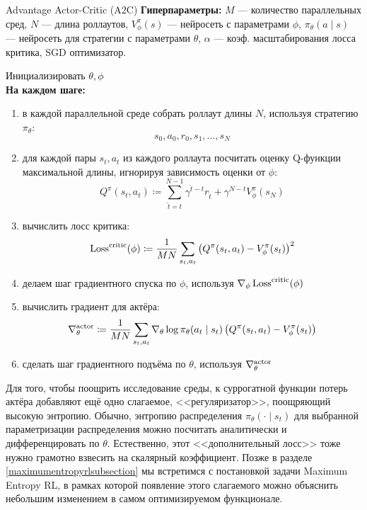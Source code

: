 \begin{algorithm}{Advantage Actor-Critic (A2C)}
\textbf{Гиперпараметры:} $M$ --- количество параллельных сред, $N$ --- длина роллаутов, $V^\pi_\phi(s)$ --- нейросеть с параметрами $\phi$, $\pi_\theta(a \mid s)$ --- нейросеть для стратегии с параметрами $\theta$, $\alpha$ --- коэф. масштабирования лосса критика, SGD оптимизатор.

\vspace{0.3cm}
Инициализировать $\theta, \phi$ \\
\textbf{На каждом шаге:}
\begin{enumerate}
    \item в каждой параллельной среде собрать роллаут длины $N$, используя стратегию $\pi_{\theta}$:
    $$s_0, a_0, r_0, s_1, \dots , s_N$$
    \item для каждой пары $s_t, a_t$ из каждого роллаута посчитать оценку Q-функции максимальной длины, игнорируя зависимость оценки от $\phi$:
    $$Q^\pi(s_t, a_t) \coloneqq \sum_{\hat{t} = t}^{N-1} \gamma^{\hat{t} - t} r_{\hat{t}} + \gamma^{N - t} V^\pi_{\phi}(s_N)$$
    \item вычислить лосс критика:
    $$\operatorname{Loss}^{\mathrm{critic}}(\phi) \coloneqq \frac{1}{MN}\sum_{s_t, a_t} \left( Q^\pi(s_t, a_t) - V^\pi_\phi(s_t) \right) ^2$$
    \item делаем шаг градиентного спуска по $\phi$, используя $\nabla_\phi \operatorname{Loss}^{\mathrm{critic}}(\phi)$
    \item вычислить градиент для актёра:
    $$\nabla^{\mathrm{actor}}_\theta \coloneqq \frac{1}{MN}\sum_{s_t, a_t} \nabla_\theta \log \pi_\theta(a_t \mid s_t) \left( Q^\pi(s_t, a_t) - V^\pi_\phi(s_t) \right) $$
    \item сделать шаг градиентного подъёма по $\theta$, используя $\nabla^{\mathrm{actor}}_\theta$
\end{enumerate}
\end{algorithm}

\begin{remark}
Для того, чтобы поощрить исследование среды, к суррогатной функции потерь актёра добавляют ещё одно слагаемое, <<регуляризатор>>, поощряющий высокую энтропию. Обычно, энтропию распределения $\pi_{\theta}(\cdot \mid s_t)$ для выбранной параметризации распределения можно посчитать аналитически и дифференцировать по $\theta$. Естественно, этот <<дополнительный лосс>> тоже нужно грамотно взвесить на скалярный коэффициент. Позже в разделе \ref{maximumentropyrlsubsection} мы встретимся с постановкой задачи Maximum Entropy RL, в рамках которой появление этого слагаемого можно объяснить небольшим изменением в самом оптимизируемом функционале.
\end{remark}

